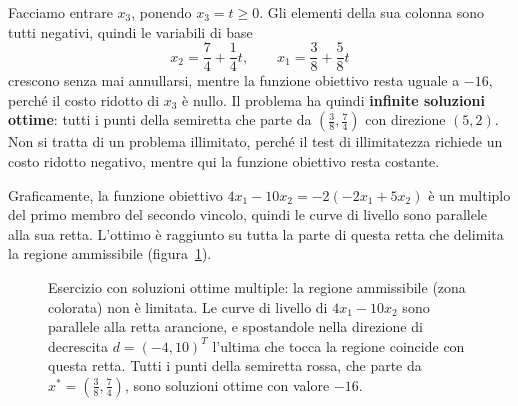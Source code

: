 Facciamo entrare $x_3$, ponendo $x_3 = t \ge 0$. Gli elementi della sua colonna sono tutti negativi, quindi le variabili di base
\[
x_2 = \frac74 + \frac14 t, \qquad x_1 = \frac38 + \frac58 t
\]
crescono senza mai annullarsi, mentre la funzione obiettivo resta uguale a $-16$, perché il costo ridotto di $x_3$ è nullo. Il problema ha quindi \textbf{infinite soluzioni ottime}: tutti i punti della semiretta che parte da $(\frac38, \frac74)$ con direzione $(5, 2)$. Non si tratta di un problema illimitato, perché il test di illimitatezza richiede un costo ridotto negativo, mentre qui la funzione obiettivo resta costante.

Graficamente, la funzione obiettivo $4x_1 - 10x_2 = -2(-2x_1 + 5x_2)$ è un multiplo del primo membro del secondo vincolo, quindi le curve di livello sono parallele alla sua retta. L'ottimo è raggiunto su tutta la parte di questa retta che delimita la regione ammissibile (figura~\ref{fig:es-multiple}).

\begin{figure}[htbp]
\centering
{}
\caption{Esercizio con soluzioni ottime multiple: la regione ammissibile (zona colorata) non è limitata. Le curve di livello di $4x_1-10x_2$ sono parallele alla retta arancione, e spostandole nella direzione di decrescita $d=(-4,10)^T$ l'ultima che tocca la regione coincide con questa retta. Tutti i punti della semiretta rossa, che parte da $x^*=(\frac38,\frac74)$, sono soluzioni ottime con valore $-16$.}
\label{fig:es-multiple}
\end{figure}

